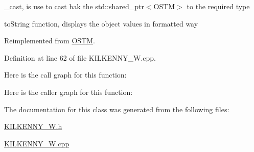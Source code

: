 \+\_\+cast, is use to cast bak the std\+::shared\+\_\+ptr$<$\+O\+S\+T\+M$>$ to the required type 

to\+String function, displays the object values in formatted way 

Reimplemented from \hyperlink{class_o_s_t_m_a513396a115f2987fd07c203309ae8a59}{O\+S\+TM}.



Definition at line 62 of file K\+I\+L\+K\+E\+N\+N\+Y\+\_\+\+W.\+cpp.



Here is the call graph for this function\+:




Here is the caller graph for this function\+:




The documentation for this class was generated from the following files\+:\begin{DoxyCompactItemize}
\item 
\hyperlink{_k_i_l_k_e_n_n_y___w_8h}{K\+I\+L\+K\+E\+N\+N\+Y\+\_\+\+W.\+h}\item 
\hyperlink{_k_i_l_k_e_n_n_y___w_8cpp}{K\+I\+L\+K\+E\+N\+N\+Y\+\_\+\+W.\+cpp}\end{DoxyCompactItemize}
